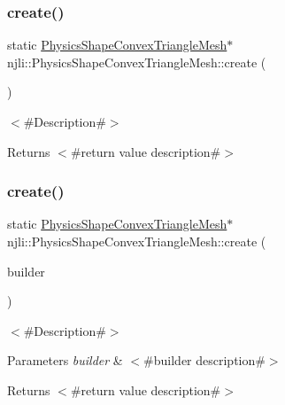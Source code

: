 \subsubsection{\texorpdfstring{create()}{create()}\hspace{0.1cm}{\footnotesize\ttfamily [1/2]}}
{\footnotesize\ttfamily static \mbox{\hyperlink{classnjli_1_1_physics_shape_convex_triangle_mesh}{Physics\+Shape\+Convex\+Triangle\+Mesh}}$\ast$ njli\+::\+Physics\+Shape\+Convex\+Triangle\+Mesh\+::create (\begin{DoxyParamCaption}{ }\end{DoxyParamCaption})\hspace{0.3cm}{\ttfamily [static]}}

$<$\#\+Description\#$>$

\begin{DoxyReturn}{Returns}
$<$\#return value description\#$>$ 
\end{DoxyReturn}
\mbox{\label{classnjli_1_1_physics_shape_convex_triangle_mesh_a1c38787be54ebd44f9f7050e6074e382}} 
\subsubsection{\texorpdfstring{create()}{create()}\hspace{0.1cm}{\footnotesize\ttfamily [2/2]}}
{\footnotesize\ttfamily static \mbox{\hyperlink{classnjli_1_1_physics_shape_convex_triangle_mesh}{Physics\+Shape\+Convex\+Triangle\+Mesh}}$\ast$ njli\+::\+Physics\+Shape\+Convex\+Triangle\+Mesh\+::create (\begin{DoxyParamCaption}\item[{const \mbox{\hyperlink{classnjli_1_1_physics_shape_convex_triangle_mesh_builder}{Physics\+Shape\+Convex\+Triangle\+Mesh\+Builder}} \&}]{builder }\end{DoxyParamCaption})\hspace{0.3cm}{\ttfamily [static]}}

$<$\#\+Description\#$>$


\begin{DoxyParams}{Parameters}
{\em builder} & $<$\#builder description\#$>$\\
\hline
\end{DoxyParams}
\begin{DoxyReturn}{Returns}
$<$\#return value description\#$>$ 
\end{DoxyReturn}
\mbox{\label{classnjli_1_1_physics_shape_convex_triangle_mesh_af9375054b0d4a6b18a833ef01917857b}} 
